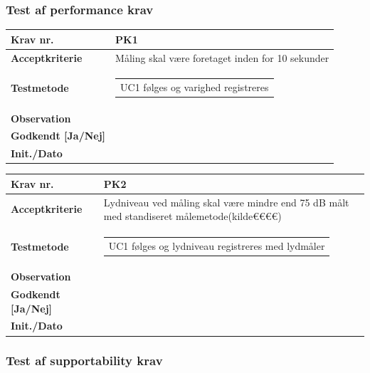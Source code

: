 \vspace{5mm}

\subsubsection{Test af performance krav}

\begin{tabularx}{1\textwidth}{|l|X|}
\hline
\textbf{Krav nr.}              & PK1  \\ \hline
\textbf{Acceptkriterie}        & Måling skal være foretaget inden for 10 sekunder  \\ \hline
\textbf{Testmetode}            & \begin{tabular}[l]{@{}l@{}} UC1 følges og varighed registreres \end{tabular}  \\ \hline
\textbf{Observation}           &  \\ \hline
\textbf{Godkendt {[}Ja/Nej{]}} &  \\ \hline
\textbf{Init./Dato}            &  \\ \hline
\end{tabularx}

\begin{tabularx}{1\textwidth}{|l|X|}
\hline
\textbf{Krav nr.}              & PK2  \\ \hline
\textbf{Acceptkriterie}        & Lydniveau ved måling skal være mindre end 75 dB målt med standiseret målemetode(kilde€€€€) \\ \hline
\textbf{Testmetode}            & \begin{tabular}[l]{@{}l@{}} UC1 følges og lydniveau registreres med lydmåler \end{tabular}  \\ \hline
\textbf{Observation}           &  \\ \hline
\textbf{Godkendt {[}Ja/Nej{]}} &  \\ \hline
\textbf{Init./Dato}            &  \\ \hline
\end{tabularx}

\vspace{5mm}

\subsubsection{Test af supportability krav}


